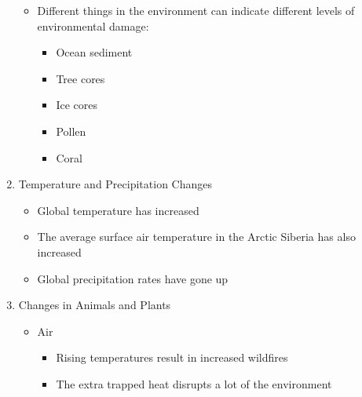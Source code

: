 \documentclass[12pt]{article}
\begin{document}
\begin{enumerate}
    \begin{itemize}

      \item Different things in the environment can indicate different levels of environmental damage:

        \begin{itemize}

          \item Ocean sediment

          \item Tree cores

          \item Ice cores

          \item Pollen

          \item Coral

        \end{itemize}

    \end{itemize}

  \item Temperature and Precipitation Changes

    \begin{itemize}

      \item Global temperature has increased

      \item The average surface air temperature in the Arctic Siberia has also increased

      \item Global precipitation rates have gone up

    \end{itemize}

  \item Changes in Animals and Plants

    \begin{itemize}

      \item Air

        \begin{itemize}

          \item Rising temperatures result in increased wildfires

          \item The extra trapped heat disrupts a lot of the environment


\end{itemize}
\end{itemize}
\end{enumerate}
\end{document}
